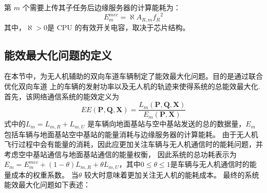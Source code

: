 第 $m$ 个需要上传其子任务后边缘服务器的计算能耗为：
\begin{equation} \label{E4-55}
E_{m}^{mec}=\aleph A_{R,m}{f_R}^2%
\end{equation}
其中，$\aleph > 0 $是 CPU 的有效开关电容，取决于芯片结构。
\subsection{能效最大化问题的定义}\label{section4-2-3}
在本节中，为无人机辅助的双向车道车辆制定了能效最大化问题。目的是通过联合优化双向车道
上的车辆的发射功率以及无人机的轨迹来使得系统的总能效最大化.
首先，该网络通信系统的能效定义为
\begin{equation} \label{E4-12}
EE(\mathbf{P}, \mathbf{Q}, \mathbf{X})=
{\frac{{{L}_{m}}\left( \mathbf{P}, \mathbf{Q}, \mathbf{X} \right)}
{{{E}_{m}}\left( \mathbf{P}, \mathbf{X} \right)}}
\end{equation}
式中的${{L}_{m}={L}_{m,R}+{L}_{m,U}}$ 是车辆向地面基站与空中基站发送的总的数据量，${E}_{m}$ 包括车辆与地面基站空中基站的能量消耗与边缘服务器的计算能耗。
由于无人机飞行过程中会有能量的消耗，因此应更加关注车辆与无人机通信时的能耗问题，并考虑空中基站通信与地面基站通信的能量权衡，
因此系统的总功耗表示为${{E}_{m}=E_{m}^{mec}+(1-\theta){L}_{m,R}+\theta{L}_{m,U}}$，其中$0\le \theta \le 1$是车辆与无人机通信时的能量成本的权重系数。
当$\theta$ 较大时意味着更加关注无人机的能耗成本。
最终的系统能效最大化问题如下表述：
